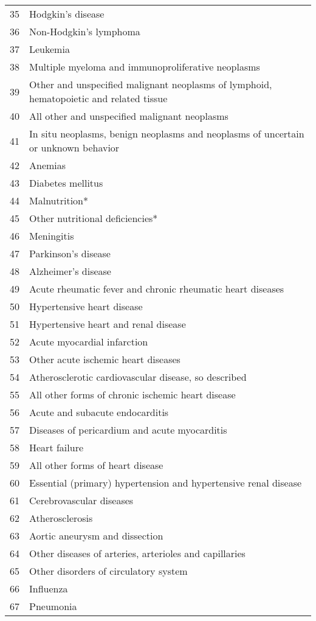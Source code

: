 \documentclass{article}
\begin{document}
\begin{center}
\begin{longtable}{|l|l|}
35&	Hodgkin's disease\\
36&	Non-Hodgkin's lymphoma\\
37&	Leukemia\\
38&	Multiple myeloma and immunoproliferative neoplasms\\
39&	Other and unspecified malignant neoplasms of lymphoid, hematopoietic and related tissue\\
40&	All other and unspecified malignant neoplasms\\
41&	In situ neoplasms, benign neoplasms and neoplasms of uncertain or unknown behavior\\
42&	Anemias\\
43&	Diabetes mellitus\\
44&	Malnutrition*\\
45&	Other nutritional deficiencies*\\
46&	Meningitis\\
47&	Parkinson's disease\\
48&	Alzheimer's disease\\
49&	Acute rheumatic fever and chronic rheumatic heart diseases\\
50&	Hypertensive heart disease\\
51&	Hypertensive heart and renal disease\\
52&	Acute myocardial infarction\\
53&	Other acute ischemic heart diseases\\
54&	Atherosclerotic cardiovascular disease, so described\\
55&	All other forms of chronic ischemic heart disease\\
56&	Acute and subacute endocarditis\\
57&	Diseases of pericardium and acute myocarditis\\
58&	Heart failure\\
59&	All other forms of heart disease\\
60&	Essential (primary) hypertension and hypertensive renal disease\\
61&	Cerebrovascular diseases\\
62&	Atherosclerosis\\
63&	Aortic aneurysm and dissection\\
64&	Other diseases of arteries, arterioles and capillaries\\
65&	Other disorders of circulatory system\\
66&	Influenza\\
67&	Pneumonia\\

\end{longtable}
\end{center}
\end{document}
